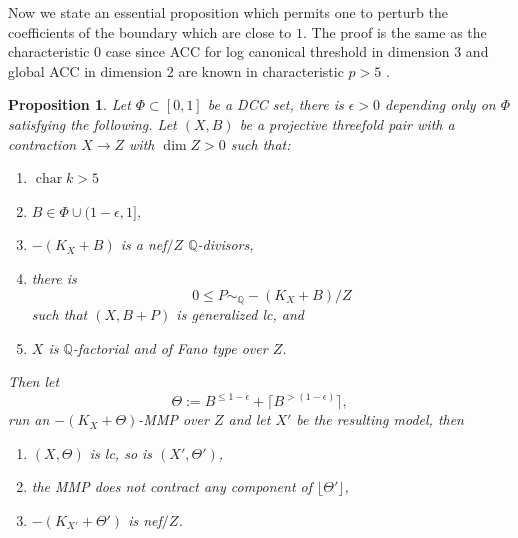 \documentclass[letterpaper,reqno,12pt]{amsart}
\DeclareMathOperator{\chara}{char}
\numberwithin{equation}{section}
\theoremstyle{plain}
\newtheorem{proposition}[theorem]{Proposition}
\begin{document}
Now we state an essential proposition which permits one to perturb the coefficients of the boundary which are close to $1$. The proof is the same as the characteristic $0$ case \cite[2.50]{birkar2019antipluricanonicalsystemsfanovarieties} since ACC for log canonical threshold in dimension $3$ and global ACC in dimension $2$ are known in characteristic $p >5$ \cite[1.10]{birkar2014existenceflipsminimalmodels}.
\begin{proposition}
\label{coe1}
    Let $\Phi\subset[0,1]$ be a DCC set, there is $\epsilon>0$ depending only on $\Phi$ satisfying the following. Let $(X,B)$ be a projective threefold pair with a contraction $X\to Z$ with $\dim Z>0$ such that:
    \begin{enumerate}
    \item $\chara k>5$
        \item $B\in\Phi\cup(1-\epsilon,1]$,
        \item $-(K_X+B)$ is a nef$/Z$ ${\mathbb Q}$-divisors,
        \item there is 
        \[0\leq P\sim_{\mathbb Q}-(K_X+B)/Z\]
        such that $(X, B+P)$ is generalized lc, and 
        \item $X$ is ${\mathbb Q}$-factorial and of Fano type over $Z$.
    \end{enumerate}
    Then let
    \[\Theta:=B^{\leq 1-\epsilon}+\lceil B^{>(1-\epsilon)}\rceil,\] run an $-(K_X+\Theta)$-MMP  over $Z$ and let $X'$ be the resulting model, then
    \begin{enumerate}
        \item $(X,\Theta)$ is lc, so is $(X',\Theta')$,
        \item the MMP does not contract any component of $\lfloor\Theta'\rfloor$,
        \item $-(K_{X'}+\Theta')$ is nef$/Z$.
    \end{enumerate}
\end{proposition}
\end{document}
